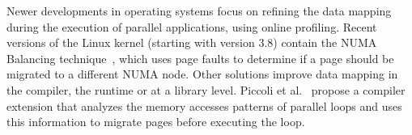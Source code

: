 Newer developments in operating systems focus on refining the data mapping during the execution of parallel applications, using online profiling.
Recent versions of the Linux kernel (starting with version 3.8) contain the
NUMA Balancing technique~\cite{Corbet}, which uses page faults to determine if
a page should be migrated to a different NUMA node.%
Other solutions improve data mapping in the compiler, the runtime or at a library level.
Piccoli et al.~\cite{Piccoli2014} propose a compiler extension that analyzes
the memory accesses patterns of parallel loops and uses this information to migrate
pages before executing the loop.


